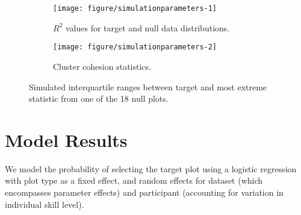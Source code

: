 \documentclass[12pt]{article}\usepackage[]{graphicx}\usepackage[]{color}
\newcommand{\comment}[2][inline]{\todo[color=SkyBlue, #1]{#2}} %
\begin{document}
\begin{appendix}
\begin{figure}[bht]\centering
\begin{subfigure}[t]{.8\linewidth}
\caption{$R^2$ values for target and null data distributions. \label{fig:simulationLineIntervals}}
\vspace{-.15in}
\texttt{[image: figure/simulationparameters-1]}
\end{subfigure}
\begin{subfigure}[t]{.8\linewidth}
\caption{Cluster cohesion statistics. \label{fig:simulationClusterIntervals}}
\vspace{-.15in}
\texttt{[image: figure/simulationparameters-2]}
\end{subfigure}
\caption{Simulated interquartile ranges between target and most extreme statistic from one of the 18 null plots. }
\end{figure}
\afterpage{\clearpage}




\section{Model Results}

We  model the probability of selecting the target plot using a logistic regression with plot type as a fixed effect, and random effects for dataset (which encompasses parameter effects) and participant (accounting for variation in individual skill level). 


\end{appendix}
\end{document}
